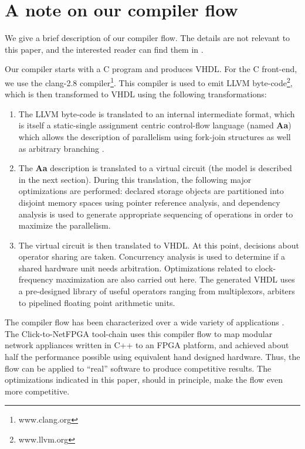 \documentclass[conference]{IEEEtran}
\begin{document}

\section{A note on our compiler flow}

We give a brief description of our compiler flow.  The
details are not relevant to this paper, and the interested
reader can find them in \cite{dsd2010}.

Our compiler starts with a C program and produces VHDL.  For the
C front-end, we use the clang-2.8 compiler\footnote{www.clang.org}.
This compiler is used to emit LLVM byte-code\footnote{www.llvm.org}, 
which is then transformed to VHDL using the following transformations:
\begin{enumerate}
\item The LLVM byte-code is translated to an internal intermediate
format, which is itself a static-single assignment centric 
control-flow language (named {\bf Aa}) which allows the description of parallelism
using fork-join structures as well as arbitrary branching \cite{Aa}.
\item The {\bf Aa} description is translated to a virtual circuit (the model
is described in the next section).  During this translation, the
following major optimizations
are performed:  declared storage objects are partitioned into disjoint memory
spaces using pointer reference analysis, and dependency analysis is used to
generate appropriate sequencing of operations in order to maximize the 
parallelism.
\item The virtual circuit is then translated to VHDL.  At this point,
decisions about operator sharing are taken.  Concurrency analysis is
used to determine if a shared hardware unit needs arbitration.  Optimizations
related to clock-frequency maximization are also carried out here.
The generated
VHDL uses a pre-designed library of useful operators ranging from
multiplexors, arbiters to pipelined floating point arithmetic units.
\end{enumerate}

The compiler flow has been characterized over a wide variety
of applications \cite{dsd2010}.   The Click-to-NetFPGA tool-chain \cite{usenix2012} 
uses this compiler flow to map modular network appliances written in C++ to
an FPGA platform, and achieved about half the
performance possible using equivalent hand designed hardware.  
Thus,  the flow can be applied to ``real'' software
to produce competitive results.  The optimizations indicated in this
paper, should in principle, make the flow even more competitive.
\end{document}

